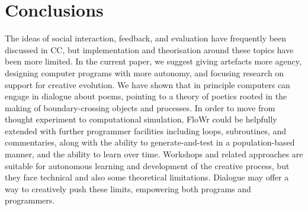\section{Conclusions}
\label{sec:conc}

The ideas of social interaction, feedback, and evaluation have frequently been discussed in CC, but implementation
and theorisation around these topics have been more limited.
In the current paper, we suggest giving artefacts more agency, designing computer programs with more autonomy, and focusing research on support for creative evolution.
We have shown that in principle computers can engage in dialogue about poems, pointing to a theory of poetics rooted in the making of boundary-crossing objects and processes.
In order to move from thought experiment to computational simulation, FloWr could be helpfully extended with further programmer facilities including loops, subroutines, and commentaries, along with the ability to generate-and-test in a population-based manner, and the ability to learn over time.
Workshops and related approaches are suitable for autonomous learning and development of the creative process, but they face technical and also some theoretical limitations.   
Dialogue may offer a way to creatively push these limits, empowering both programs and programmers.


